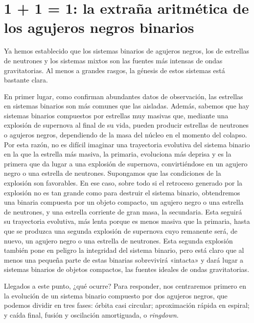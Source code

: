 \section[La aritmética de los agujeros negros binarios]{1 + 1 = 1: la extraña aritmética de los agujeros negros binarios}\label{sec:08-merger}

Ya hemos establecido que los sistemas binarios de agujeros negros, los de estrellas de neutrones y los sistemas mixtos son las fuentes más intensas de ondas gravitatorias. Al menos a grandes rasgos, la génesis de estos sistemas está bastante clara.

En primer lugar, como confirman abundantes datos de observación, las estrellas en sistemas binarios son más comunes que las aisladas. Además, sabemos que hay sistemas binarios compuestos por estrellas muy masivas que, mediante una explosión de supernova al final de su vida, pueden producir estrellas de neutrones o agujeros negros, dependiendo de la masa del núcleo en el momento del colapso. Por esta razón, no es difícil imaginar una trayectoria evolutiva del sistema binario en la que la estrella más masiva, la primaria, evoluciona más deprisa y es la primera que da lugar a una explosión de supernova, convirtiéndose en un agujero negro o una estrella de neutrones. Supongamos que las condiciones de la explosión son favorables. En ese caso, sobre todo si el retroceso generado por la explosión no es tan grande como para destruir el sistema binario, obtendremos una binaria compuesta por un objeto compacto, un agujero negro o una estrella de neutrones, y una estrella corriente de gran masa, la secundaria. Esta seguirá su trayectoria evolutiva, más lenta porque es menos masiva que la primaria, hasta que se produzca una segunda explosión de supernova cuyo remanente será, de nuevo, un agujero negro o una estrella de neutrones. Esta segunda explosión también pone en peligro la integridad del sistema binario, pero está claro que al menos una pequeña parte de estas binarias sobrevivirá «intacta» y dará lugar a sistemas binarios de objetos compactos, las fuentes ideales de ondas gravitatorias.

Llegados a este punto, ¿qué ocurre? Para responder, nos centraremos primero en la evolución de un sistema binario compuesto por dos agujeros negros, que podemos dividir en tres fases: órbita casi circular; aproximación rápida en espiral; y caída final, fusión y oscilación amortiguada, o \emph{ringdown}.

